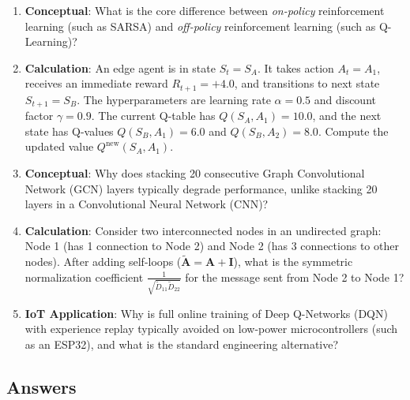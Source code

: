 \begin{checkyourself}
\begin{enumerate}
    \item \textbf{Conceptual}: What is the core difference between \emph{on-policy} reinforcement learning (such as SARSA) and \emph{off-policy} reinforcement learning (such as Q-Learning)?
    \item \textbf{Calculation}: An edge agent is in state $S_t = S_A$. It takes action $A_t = A_1$, receives an immediate reward $R_{t+1} = +4.0$, and transitions to next state $S_{t+1} = S_B$. The hyperparameters are learning rate $\alpha = 0.5$ and discount factor $\gamma = 0.9$. The current Q-table has $Q(S_A, A_1) = 10.0$, and the next state has Q-values $Q(S_B, A_1) = 6.0$ and $Q(S_B, A_2) = 8.0$. Compute the updated value $Q^{\text{new}}(S_A, A_1)$.
    \item \textbf{Conceptual}: Why does stacking 20 consecutive Graph Convolutional Network (GCN) layers typically degrade performance, unlike stacking 20 layers in a Convolutional Neural Network (CNN)?
    \item \textbf{Calculation}: Consider two interconnected nodes in an undirected graph: Node 1 (has 1 connection to Node 2) and Node 2 (has 3 connections to other nodes). After adding self-loops ($\mathbf{\tilde{A}} = \mathbf{A} + \mathbf{I}$), what is the symmetric normalization coefficient $\frac{1}{\sqrt{\tilde{D}_{11}\tilde{D}_{22}}}$ for the message sent from Node 2 to Node 1?
    \item \textbf{IoT Application}: Why is full online training of Deep Q-Networks (DQN) with experience replay typically avoided on low-power microcontrollers (such as an ESP32), and what is the standard engineering alternative?
\end{enumerate}
\end{checkyourself}

\subsection*{Answers}

